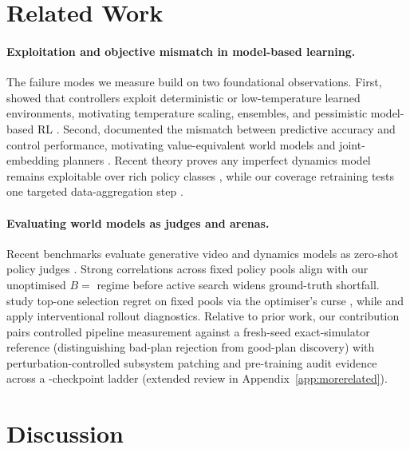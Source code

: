 \section{Related Work}\label{sec:related}

\paragraph{Exploitation and objective mismatch in model-based learning.}
The failure modes we measure build on two foundational observations. First, \citet{ha2018worldmodels} showed that controllers exploit deterministic or low-temperature learned environments, motivating temperature scaling, ensembles, and pessimistic model-based RL \citep{kurutach2018metrpo,chua2018pets,janner2019mbpo,yu2020mopo,kidambi2020morel}. Second, \citet{lambert2020objective} documented the mismatch between predictive accuracy and control performance, motivating value-equivalent world models \citep{farahmand2017vaml,grimm2020valueequivalence} and joint-embedding planners \citep{maes2026leworldmodel,singh2026evalprotocol,cheung2026onestep}. Recent theory proves any imperfect dynamics model remains exploitable over rich policy classes \citep{bhamidipaty2026exploitable}, while our coverage retraining tests one targeted data-aggregation step \citep{ross2012agnostic}.

\paragraph{Evaluating world models as judges and arenas.}
Recent benchmarks evaluate generative video and dynamics models as zero-shot policy judges \citep{quevedo2025worldgym,guo2026ctrlworld,geminirobotics2025veo,valevski2025gamengen,bruce2024genie}. Strong correlations across fixed policy pools align with our unoptimised $B ={}$ regime before active search widens ground-truth shortfall. \citet{ariq2026ravel} study top-one selection regret on fixed pools via the optimiser's curse \citep{smith2006optimizer}, while \citet{yao2026rolloutfaith} and \citet{vakalis2026intervention} apply interventional rollout diagnostics. Relative to prior work, our contribution pairs controlled pipeline measurement against a fresh-seed exact-simulator reference (distinguishing bad-plan rejection from good-plan discovery) with perturbation-controlled subsystem patching and pre-training audit evidence across a \Ladder-checkpoint ladder (extended review in Appendix~\ref{app:morerelated}).

\section{Discussion}\label{sec:discussion}

